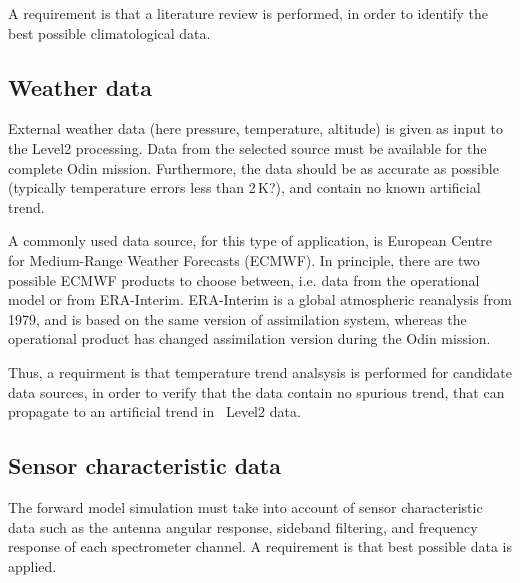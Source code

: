 A requirement is that a literature review is performed,
in order to identify the best possible climatological data.


\subsection{Weather data}
External weather data (here pressure, temperature, altitude) is given as input
to the Level2 processing. Data from the selected source must be available
for the complete Odin mission. Furthermore, the data should be as accurate
as possible (typically temperature errors less than 2\,K?), 
and contain no known artificial trend. 

A commonly used data source, for this type of application, is 
European Centre for Medium-Range Weather Forecasts (ECMWF).
In principle, there are two possible ECMWF products to choose
between, i.e. data from the operational model or from   
ERA-Interim. ERA-Interim is a global atmospheric reanalysis from 1979,
and is based on the same version of assimilation system,
whereas the operational product has changed assimilation
version during the Odin mission. 
 
Thus, a requirment is that temperature trend analsysis is performed 
for candidate data sources, in order to verify that the data contain
no spurious trend, that can propagate to an artificial trend in
\smr\ Level2 data.
 

\subsection{Sensor characteristic data}  
The forward model simulation must take into account of sensor characteristic data
such as the antenna angular response, sideband filtering, and frequency response 
of each spectrometer channel. A requirement is that best possible
data is applied. 



